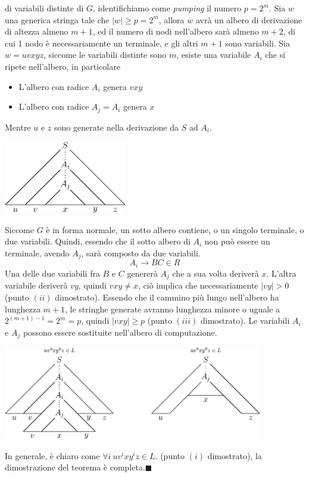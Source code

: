 \documentclass[10pt, letterpaper]{report}
\begin{document}
di variabili distinte di $G$, identifichiamo come \textit{pumping} il numero $p=2^m$. Sia $w$ una generica stringa tale 
che $|w|\ge p = 2^m$, allora $w$ avrà un albero di derivazione di altezza almeno $m+1$, ed il numero di nodi 
nell'albero sarà almeno $m+2$, di cui 1 nodo è necessariamente un terminale, e gli altri $m+1$ sono variabili.\acc 
Sia $w=uvxyz$, siccome le variabili distinte sono $m$, esiste una variabile $A_i$ che si ripete nell'albero, in particolare \begin{itemize}
    \item L'albero con radice $A_i$ genera $vxy$
    \item L'albero con radice $A_j=A_i$ genera $x$
\end{itemize}
Mentre $u$ e $z$ sono generate nella derivazione da $S$ ad $A_i$.\begin{center}
    \includegraphics[width=0.4\textwidth ]{images/alberoDer1.eps}
\end{center}
Siccome $G$ è in forma normale, un sotto albero contiene, o un singolo terminale, o due variabili. Quindi, essendo che il 
sotto albero di $A_i$ non può essere un terminale, avendo $A_j$, sarà composto da due variabili. 
$$A_i\longrightarrow BC\in R $$
Una delle due variabili fra $B$ e $C$ genererà $A_j$ che a sua volta deriverà $x$. L'altra variabile deriverà 
$vy$, quindi $vxy\ne x$, ciò implica che necessariamente $|vy|>0$ (punto $(ii)$ dimostrato).\acc 
Essendo che il cammino più lungo nell'albero ha lunghezza $m+1$, le stringhe generate avranno lunghezza 
minore o uguale a $2^{(m+1)-1}=2^m=p$, quindi $|vxy|\ge p$  (punto $(iii)$ dimostrato).\acc 
Le variabili $A_i$ e $A_j$ possono essere sostituite nell'albero di computazione.
\begin{center}
    \includegraphics[width=0.85\textwidth ]{images/alberoDer2.eps}
\end{center}
In generale, è chiaro come $\forall i \ uv^ixy^iz\in L$. (punto $(i)$ dimostrato), la dimostrazione del 
teorema è completa.\hfill$\blacksquare$
\end{document}
